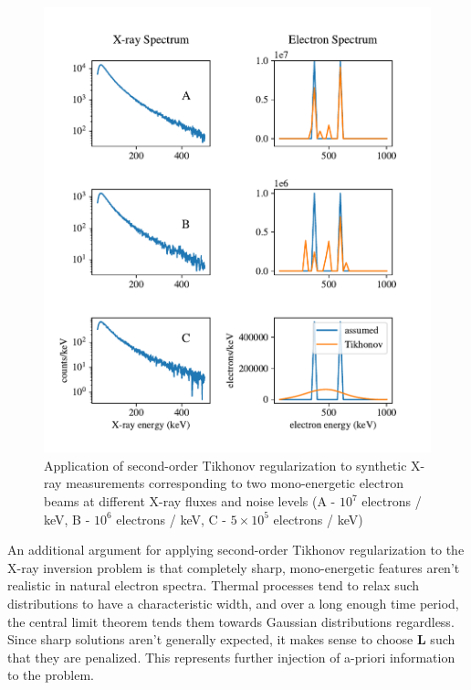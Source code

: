 \begin{figure}[p]
    \centering
    \includegraphics[width=1.1\textwidth]{figures/chapter_4/two_peak_second_order_example/two_peak_second_order.pdf}
    \caption{Application of second-order Tikhonov regularization to synthetic X-ray measurements corresponding to two mono-energetic electron beams at different X-ray fluxes and noise levels (A - $10^7$ electrons / keV, B - $10^6$ electrons / keV, C - $5\times10^5$ electrons / keV)}
    \label{two_peak_second_order_example}
\end{figure}
\newpage

An additional argument for applying second-order Tikhonov regularization to the X-ray inversion problem is that completely sharp, mono-energetic features aren't realistic in natural electron spectra. Thermal processes tend to relax such distributions to have a characteristic width, and over a long enough time period, the central limit theorem tends them towards Gaussian distributions regardless. Since sharp solutions aren't generally expected, it makes sense to choose $\mathbf{L}$ such that they are penalized. This represents further injection of a-priori information to the problem.  

